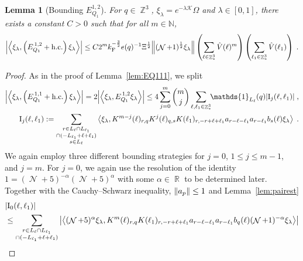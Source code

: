 \documentclass[12pt,a4paper]{article}
\numberwithin{equation}{section}
\newcommand{\cK}{\mathcal{K}}
\newcommand{\NNN}{\mathbb{N}}
\newcommand{\1}{\mathbb{I}}
\newcommand{\F}{\mathrm{F}}
\newcommand{\I}{\mathrm{I}}
\DeclareMathOperator{\R}{\mathbb{R}}
\DeclareMathOperator{\Z}{\mathbb{Z}}
\DeclareMathOperator{\NN}{\mathcal{N}}
\newcommand{\half}{\frac{1}{2}}
\newcommand{\eva}[1]{\left\langle #1 \right\rangle}
\theoremstyle{plain}
\newtheorem{lemma}[theorem]{Lemma}
\theoremstyle{definition}
\theoremstyle{remark}
\theoremstyle{plain}
\theoremstyle{definition}
\theoremstyle{remark}
\begin{document}
\begin{lemma}[Bounding $E_{Q_1}^{1,2}$]\label{lem:EQ112}
For $ q \in \Z^3 $, $\xi_\lambda = e^{-\lambda \cK} \Omega$ and $ \lambda \in [0,1] $, there exists a constant $ C > 0 $ such that for all $ m \in \NNN $,
\begin{equation}
	\abs{\eva{\xi_\lambda,\left(E^{\,1,2}_{Q_1}+\mathrm{h.c.}\right) \xi_\lambda }}\nonumber
	\leq C 2^m k_{\F}^{-\frac{3}{2}} e(q)^{-1} \Xi^{\half}
		\norm{(\NN+1)^\half \xi_\lambda }
		\left(\sum\limits_{\ell\in \Z^3_*} \hat{V}(\ell)^m \right)
		\left(\sum\limits_{\ell_1\in \Z^3_*} \hat{V}(\ell_1) \right) \;. \label{eq:estEQ112}
\end{equation}
\end{lemma}
\begin{proof}
As in the proof of Lemma~\ref{lem:EQ111}, we split
\begin{equation} \label{eq:EQ1121}
\begin{aligned}
	\abs{\eva{\xi_\lambda,\left(E^{\,1,1}_{Q_1}+\mathrm{h.c.}\right) \xi_\lambda }} 
	= 2\abs{\eva{\xi_\lambda, E^{\,1,2}_{Q_1} \xi_\lambda }}
	\le 4 \sum_{j=0}^m {{m}\choose j} \sum\limits_{\ell,\ell_1  \in \Z^3_*}\!\! \mathds{1}_{L_\ell}(q) |\I_j(\ell, \ell_1)| \;,\\
	\I_j(\ell, \ell_1)
	:= \sum\limits_{\substack{r\in L_{\ell} \cap L_{\ell_1}\\ \cap (-L_{\ell_1}+\ell+\ell_1)\\ s \in L_{\ell}}} 
		\eva{\xi_\lambda, K^{m-j}(\ell)_{r,q} K^{j}(\ell)_{q,s}K(\ell_1)_{r,-r+\ell+\ell_1} a_{r-\ell-\ell_1} a_{r-\ell_1} b_{s}(\ell) \xi_\lambda} \;. \\
\end{aligned}
\end{equation}
We again employ three different bounding strategies for $ j = 0 $, $ 1 \le j \le m-1 $, and $ j = m $. For $ j = 0 $, we again use the resolution of the identity $1 = (\NN+5)^{-\alpha}(\NN+5)^{\alpha}$ with some $\alpha \in \R$ to be determined later. Together with the Cauchy--Schwarz inequality, $ \norm{a_p} \le 1 $ and Lemma~\ref{lem:pairest}
\begin{align}
	&|\I_0(\ell, \ell_1)| \nonumber\\
	&\leq \sum\limits_{\substack{r\in L_{\ell} \cap L_{\ell_1}\\ \cap (-L_{\ell_1}+\ell+\ell_1)}} \abs{\eva{  (\NN+5)^{\alpha} \xi_\lambda, K^m(\ell )_{r,q} K(\ell_1)_{r,-r+\ell+\ell_1} a_{r-\ell-\ell_1} a_{r-\ell_1} b_{q}(\ell)  (\NN+1)^{-\alpha} \xi_\lambda }}\nonumber\\

\end{align}
\end{proof}
\end{document}
